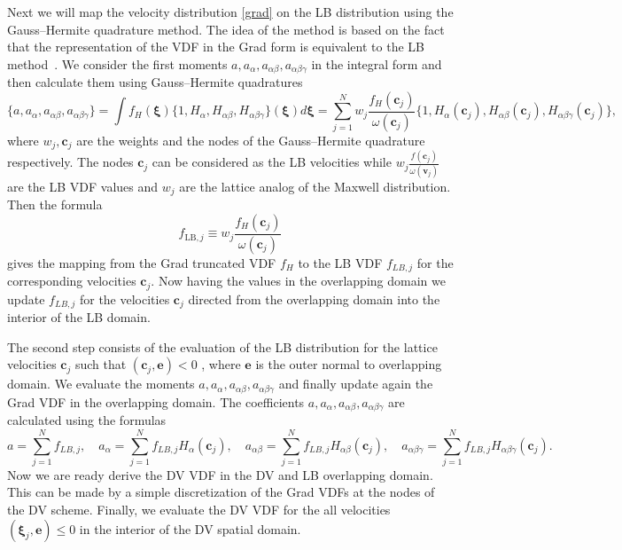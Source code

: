 \documentclass[]{elsarticle} %
\newcommand{\bxi}{\boldsymbol{\xi}}
\newcommand{\bv}{\boldsymbol{v}}
\newcommand{\bc}{\boldsymbol{c}}
\begin{document}
{Next we will map the velocity distribution \eqref{grad} on the LB distribution using the Gauss--Hermite quadrature method.
The idea of the method is based on the fact that the representation of the VDF in the Grad form
is equivalent to the LB method~\cite{He1997, Shan1998, Shan2006}.
We consider the first moments $a,a_{\alpha},a_{\alpha\beta}, a_{\alpha\beta \gamma}$ in the integral form and then calculate them using Gauss--Hermite quadratures
$$
\{ a,a_{\alpha},a_{\alpha\beta}, a_{\alpha\beta \gamma} \}=\int f_H(\bxi)\{1,H_{\alpha}, H_{\alpha\beta} ,H_{\alpha\beta \gamma}\}(\bxi)d\bxi=\sum_{j=1}^N w_j\frac{f_H(\boldsymbol{c}_j)}{\omega(\bc_j)}
\{1,H_{\alpha}(\bc_j),H_{\alpha\beta}(\bc_j), H_{\alpha\beta\gamma}(\bc_j) \},
$$
where $w_j, \boldsymbol{c}_j$ are the weights and the nodes of the Gauss--Hermite quadrature respectively. The nodes $\bc_j$ can be considered as the LB velocities while $ w_j\frac{f(\bc_j)}{\omega(\bv_j)}$ are the LB VDF values and
$w_j$ are the lattice analog of the Maxwell distribution.  Then the formula
\begin{equation}\label{grad_to_latt}
f_{\mathrm{LB},j}\equiv w_j\frac{f_H(\bc_j)}{\omega(\bc_j)}
\end{equation}
gives the mapping from the Grad truncated VDF $f_H$ to the LB VDF $f_{LB,j}$ for the corresponding velocities $\bc_j$. Now having the values in the overlapping domain we update $f_{LB,j}$ for the velocities $\bc_j$ directed from the overlapping domain into the interior of the LB domain.


The second step consists of the evaluation of the LB   distribution for the lattice velocities $\boldsymbol{c}_j$ such that $(\boldsymbol{c}_j,\mathbf{e})<0$ , where $\mathbf{e}$ is the outer normal to overlapping domain.  We evaluate the moments $a,a_{\alpha},a_{\alpha\beta},
a_{\alpha\beta\gamma}$ and finally update again the Grad VDF in the overlapping domain. The coefficients $a,a_{\alpha},a_{\alpha\beta},
a_{\alpha\beta\gamma}$ are calculated using the formulas
$$
a=\sum_{j=1}^N f_{LB,j}, \quad a_{\alpha}=\sum_{j=1}^N f_{LB,j}H_{\alpha}(\bc_j), \quad a_{\alpha\beta}=\sum_{j=1}^N f_{LB,j}H_{\alpha\beta}(\bc_j),
\quad a_{\alpha\beta\gamma}=\sum_{j=1}^N f_{LB,j}H_{\alpha\beta\gamma}(\bc_j).
$$
Now we are ready derive the DV VDF in the DV and LB overlapping domain. This can be made by a simple
discretization of the Grad VDFs at the nodes of the DV scheme. Finally, we evaluate the DV VDF for the all velocities $(\bxi_j,\mathbf{e}) \leq 0$
in the interior of the DV spatial domain.

}
\end{document}
